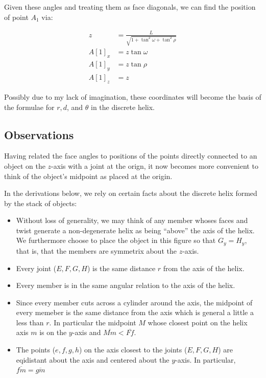 \documentclass[11pt]{article}
\begin{document}
Given these angles and treating them as face diagonals,
we can find the position of point $A_1$ via:

\begin{align}
  z &= \frac{L}{\sqrt{1 + \tan^2{\omega} + \tan^2{\rho}}}  \\
  A[1]_x &= z \tan{\omega} \\
  A[1]_y &= z \tan{\rho} \\
  A[1]_z &= z
\end{align}

Possibly due to my lack of imagination, these coordinates
will become the basis of the formulae for $r,d$, and $\theta$
in the discrete helix.

\subsection{Observations}

Having related the face angles to positions of the points directly connected
to an object on the $z$-axis with a joint at the orign, it now becomes more
convenient to think of the object's midpoint as placed at the origin.

In the derivations below, we rely on certain facts about
the discrete helix formed by the stack of objects:
\begin{itemize}
\item Without loss of generality, we may think of any member whoses faces
  and twist generate a non-degenerate helix as being ``above'' the
  axis of the helix. We furthermore choose to place the object in
  this figure so that $G_y = H_y$, that is, that the members are symmetrix
  about the $z$-axis. 
  
\item Every joint ($E,F,G,H$) is the same distance $r$ from the axis of the helix.
\item Every member is in the same angular relation to the axis of the helix.
\item Since every member cuts across a cylinder around the axis,
  the midpoint of every memeber is the same distance from the axis
  which is general a little a less than $r$. In particular the midpoint $M$
  whose closest point on the helix axis $m$ is on the $y$-axis and
  $\overline{Mm} < \overline{Ff}$.
\item The points ($e,f,g,h$) on the axis closest to the joints ($E,F,G,H$)
  are eqidistant about the axis and centered about the $y$-axis. In
  particular, $\overline{fm} = \overline{gm}$
\end{itemize}
\end{document}
